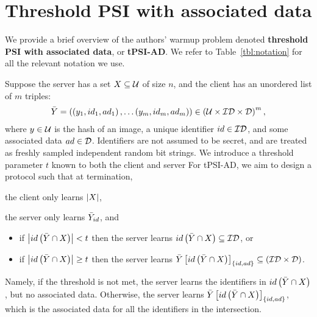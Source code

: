 
\section{Threshold PSI with associated data} %
\label{sec:threshold_psi_with_associated_data}

We provide a brief overview of the authors' warmup problem denoted \textbf{threshold PSI with associated data}, or \textbf{tPSI-AD}. We refer to Table~\ref{tbl:notation} for all the relevant notation we use.

Suppose the server has a set $X \subseteq \mathcal{U}$ of size $n$, and the client has an unordered list of $m$ triples:
\begin{align*}
      \bar{Y} = \left(\left(y_1, id_1, ad_1\right) , \dots   \left(y_m, id_m, ad_m\right)\right) \in \left(\mathcal{U} \times \mathcal{ID} \times \mathcal{D}\right)^m,
\end{align*}
where $y \in \mathcal{U}$ is the hash of an image, a unique identifier $id \in \mathcal{ID}$, and some associated data $ad \in \mathcal{D}$. Identifiers are not assumed to be secret, and are treated as freshly sampled independent random bit strings. We introduce a threshold parameter $t$ known to both the client and server For tPSI-AD, we aim to design a protocol such that at termination, \begin{enumerate*}[label=(\roman*)]
	\item the client only learns $\left\lvert X\right\rvert$, 
	\item the server only learns $\bar{Y}_{id}$, and
\end{enumerate*}
\begin{itemize}
	\item if $\left\lvert id \left(\bar{Y} \cap X\right)\right\rvert < t$ then the server learns $id \left(\bar{Y} \cap X\right) \subseteq \mathcal{ID}$, or
	\item if $\left\lvert id \left(\bar{Y} \cap X\right)\right\rvert \geq t$ then the server learns $\bar{Y}\left[id \left(\bar{Y} \cap X\right)\right]_{\left\{id,ad\right\}} \subseteq \left(\mathcal{ID} \times \mathcal{D}\right) $.
\end{itemize}
Namely, if the threshold is not met, the server learns the identifiers in $id \left(\bar{Y} \cap X\right)$, but no associated data. Otherwise, the server learns $\bar{Y}\left[id \left(\bar{Y} \cap X\right)\right]_{\left\{id,ad\right\}}$, which is the associated data for all the identifiers in the intersection.

